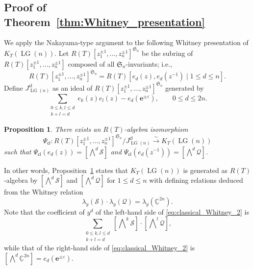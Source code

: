 \documentclass[a4paper, 11pt, reqno]{amsart}
\numberwithin{equation}{section}
\newcommand{\BC}{\mathbb{C}}
\newcommand{\udBC}{\underline{\BC}}
\newcommand{\CQ}{\mathcal{Q}}
\newcommand{\CS}{\mathcal{S}}
\newcommand{\FS}{\mathfrak{S}}
\newcommand{\ve}{\varepsilon}
\newcommand{\e}{\mathbf{e}}
\newcommand{\cl}{\mathsf{cl}}
\newcommand{\LG}{\operatorname{LG}}
\newcommand{\class}[1]{\left[ #1 \right]}
\newcommand{\extprod}{\bigwedge\nolimits}
\theoremstyle{plain}
\newtheorem{prop}[thm]{Proposition}
\theoremstyle{definition}
\theoremstyle{remark}
\begin{document}
\subsection{Proof of Theorem~\ref{thm:Whitney_presentation}}
We apply the Nakayama-type argument to the following Whitney presentation of $K_{T}(\LG(n))$. 
Let $R(T)[z_{1}^{\pm 1}, \ldots, z_{n}^{\pm 1}]^{\FS_{n}}$ be the subring of $R(T)[z_{1}^{\pm 1}, \ldots, z_{n}^{\pm 1}]$ composed of all $\FS_{n}$-invariants; i.e., 
\begin{equation}
R(T)[z_{1}^{\pm 1}, \ldots, z_{n}^{\pm 1}]^{\FS_{n}} = R(T)[e_{d}(z), e_{d}(z^{-1}) \mid 1 \le d \le n].
\end{equation} 
Define $J_{\LG(n)}^{\cl}$ as an ideal of $R(T)[z_{1}^{\pm 1}, \ldots, z_{n}^{\pm 1}]^{\FS_{n}}$ generated by 
\begin{equation}
\sum_{\substack{0 \le k, l \le d \\ k+l=d}} e_{k}(z)e_{l}(z) - e_{d}(\e^{\pm \ve}), \qquad 0 \le d \le 2n. 
\end{equation}
\begin{prop} \label{prop:classical_Whitney}
There exists an $R(T)$-algebra isomorphism
\begin{equation}
\Psi_{\cl}: R(T)[z_{1}^{\pm 1}, \ldots, z_{n}^{\pm 1}]^{\FS_{n}}/J_{\LG(n)}^{\cl} \xrightarrow{\sim} K_{T}(\LG(n))
\end{equation}
such that $\Psi_{\cl}(e_{d}(z)) = \class{\extprod^{d} \CS}$ and $\Psi_{\cl}(e_{d}(z^{-1})) = \class{\extprod^{d} \CQ}$. 
\end{prop}
In other words, Proposition~\ref{prop:classical_Whitney} states that $K_{T}(\LG(n))$ is generated as $R(T)$-algebra by $\class{\extprod^{d} \CS}$ and $\class{\extprod^{d} \CQ}$ for $1 \le d \le n$ with defining relations deduced from the Whitney relation 
\begin{equation} \label{eq:classical_Whitney_2}
\lambda_{y}(\CS) \cdot \lambda_{y}(\CQ) = \lambda_{y}(\udBC^{2n}). 
\end{equation}
Note that the coefficient of $y^{d}$ of the left-hand side of \eqref{eq:classical_Whitney_2} is 
\begin{equation}
\sum_{\substack{0 \le k, l \le d \\ k+l = d}} \class{\extprod^{k} \CS} \cdot \class{\extprod^{l} \CQ}, 
\end{equation}
while that of the right-hand side of \eqref{eq:classical_Whitney_2} is $\class{\extprod^{d} \udBC^{2n}} = e_{d}(\e^{\pm \ve})$. 
\end{document}
